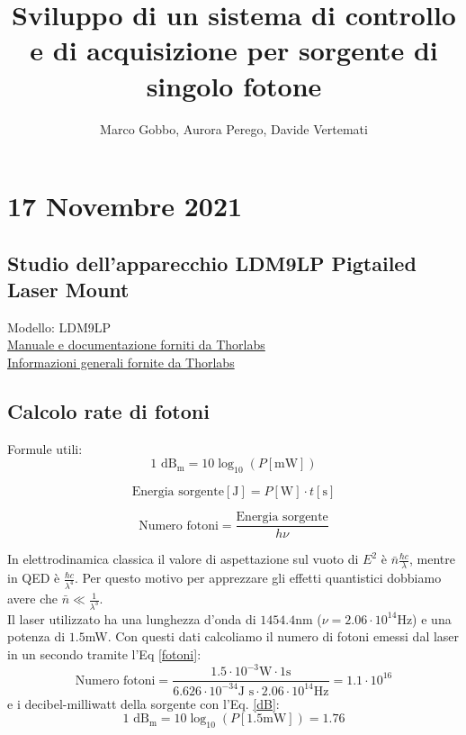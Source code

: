 \documentclass{article}
\title{Sviluppo di un sistema di controllo e di acquisizione per sorgente di singolo fotone}
\author{Marco Gobbo, Aurora Perego, Davide Vertemati}
\numberwithin{equation}{section}
\begin{document}
\maketitle

\section{17 Novembre 2021}
\subsection{Studio dell’apparecchio LDM9LP 
Pigtailed Laser Mount}
Modello: LDM9LP\\
\href{https://www.thorlabs.com/_sd.cfm?fileName=TTN027954-D02.pdf&partNumber=LDM9LP}{Manuale e documentazione forniti da Thorlabs}\\
\href{https://www.thorlabs.com/newgrouppage9.cfm?objectgroup_id=4839&pn=LDM9LP#4839}{Informazioni generali fornite da Thorlabs}

\subsection{Calcolo rate di fotoni}
Formule utili:
\begin{equation} \label{dB}
    1 \text{ dB}_\text{m}=10 \log_{10}\left(P\left[\text{mW}\right]\right)
\end{equation}

\begin{equation*}
    \text{Energia sorgente} [\text{J}] = P[\text{W}]\cdot t[\text{s}]
\end{equation*}

\begin{equation} \label{fotoni}
    \text{Numero fotoni}=\frac{\text{Energia sorgente}}{h\nu}
\end{equation}

\noindent In elettrodinamica classica il valore di aspettazione sul vuoto di $E^2$ è $\bar{n} \frac{\hbar c}{\lambda}$, mentre in QED è $\frac{\hbar c}{\lambda^4}$.
Per questo motivo per apprezzare gli effetti quantistici dobbiamo avere che $\bar{n}\ll\frac{1}{\lambda^3}$. \\
\noindent Il laser utilizzato ha una lunghezza d'onda di $1454.4$nm ($\nu = 2.06 \cdot 10^{14}$Hz) e una potenza di $1.5$mW. Con questi dati calcoliamo il numero di fotoni emessi dal laser in un secondo tramite l'Eq \eqref{fotoni}:
\begin{equation*} 
    \text{Numero fotoni}=\frac{1.5\cdot10^{-3}\text{W}\cdot1\text{s}}{6.626 \cdot 10^{-34} \text{J s} \cdot 2.06 \cdot 10^{14}\text{Hz}} = 1.1\cdot 10^{16}
\end{equation*}
e i decibel-milliwatt della sorgente con l'Eq. \eqref{dB}:
\begin{equation*}
    1 \text{ dB}_\text{m}=10\log_{10}\left(P\left[1.5 \text{mW}\right]\right)=1.76
\end{equation*}
\end{document}
